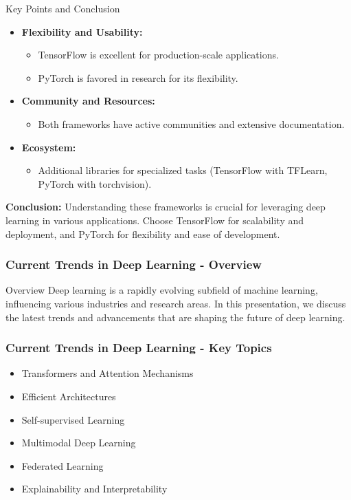 \documentclass[aspectratio=169]{beamer}
\begin{document}
\begin{frame}{Key Points and Conclusion}
    \begin{itemize}
        \item \textbf{Flexibility and Usability:} 
        \begin{itemize} 
            \item TensorFlow is excellent for production-scale applications.
            \item PyTorch is favored in research for its flexibility.
        \end{itemize}
        \item \textbf{Community and Resources:} 
        \begin{itemize} 
            \item Both frameworks have active communities and extensive documentation.
        \end{itemize}
        \item \textbf{Ecosystem:} 
        \begin{itemize} 
            \item Additional libraries for specialized tasks (TensorFlow with TFLearn, PyTorch with torchvision).
        \end{itemize}
    \end{itemize}
    
    \textbf{Conclusion:} Understanding these frameworks is crucial for leveraging deep learning in various applications. Choose TensorFlow for scalability and deployment, and PyTorch for flexibility and ease of development.
\end{frame}

\begin{frame}[fragile]
    \frametitle{Current Trends in Deep Learning - Overview}
    \begin{block}{Overview}
        Deep learning is a rapidly evolving subfield of machine learning, influencing various industries and research areas. In this presentation, we discuss the latest trends and advancements that are shaping the future of deep learning.
    \end{block}
\end{frame}

\begin{frame}[fragile]
    \frametitle{Current Trends in Deep Learning - Key Topics}
    \begin{itemize}
        \item Transformers and Attention Mechanisms
        \item Efficient Architectures
        \item Self-supervised Learning
        \item Multimodal Deep Learning
        \item Federated Learning
        \item Explainability and Interpretability
    \end{itemize}
\end{frame}
\end{document}
